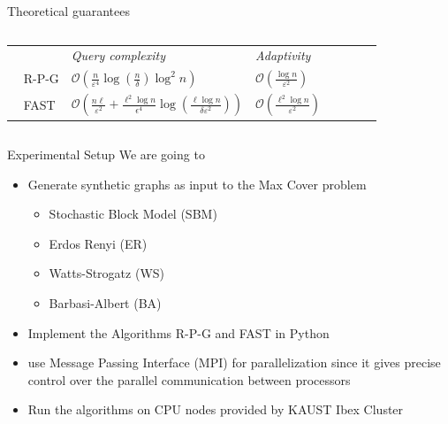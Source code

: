 \documentclass{beamer} %
\begin{document}
\begin{frame}{Theoretical guarantees}
\begin{columns}
    \column{\dimexpr\paperwidth-15pt}
\begin{table}[h]
\begin{center}
\begin{tabular}{lllllll}%
        & \emph{Query complexity} & \emph{Adaptivity} &   \\\ \vspace{0.5cm}
 \textsc{R-P-G}& $\mathcal{O}\left(  \frac{n}{\varepsilon^4}  \log\left(\frac{n}{\delta}\right) \log^2 n\right)  $ & $ \mathcal{O}\left(\frac{\log n}{\varepsilon^2}  \right)$ & \\\ \vspace{0.3cm}
  \textsc{FAST} &     $\mathcal{O}\left(\frac{  n \ell}{\varepsilon^2} +  \frac{ \ell^2 \log n}{\epsilon^4}   \log(\frac{\ell\log n}{\delta \varepsilon^2})\right)$        &   $\mathcal{O}\left(\frac{ \ell^2 \log n}{\varepsilon^2}\right)$   & 
\end{tabular}
  \label{tab:queries}
\end{center}
\end{table}
\end{columns}
\end{frame}



\begin{frame}{Experimental Setup}
We are going to 
\begin{itemize}
  \item Generate synthetic graphs as input to the Max Cover problem
    \begin{itemize}
        \item Stochastic Block Model (SBM)
        \item Erdos Renyi (ER)
        \item Watts-Strogatz (WS)
        \item Barbasi-Albert (BA)
    \end{itemize}
  \item Implement the Algorithms R-P-G and FAST in Python
  \item use Message Passing Interface (MPI) for parallelization since it gives precise control over the parallel communication between processors
  \item Run the algorithms on CPU nodes provided by KAUST Ibex Cluster

\end{itemize}

\end{frame}
\end{document}
